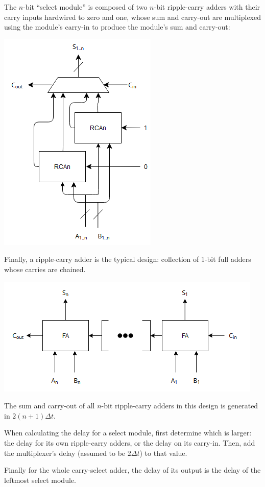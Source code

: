 \documentclass[12pt]{article}
\begin{document}
The $n$-bit ``select module'' is composed of two $n$-bit ripple-carry adders
with their carry inputs hardwired to zero and one, whose sum and carry-out are
multiplexed using the module's carry-in to produce the module's sum and
carry-out:

\includegraphics{select-module.png}

Finally, a ripple-carry adder is the typical design: collection of 1-bit full
adders whose carries are chained.

\includegraphics{ripple-carry.png}

The sum and carry-out of all $n$-bit ripple-carry adders in this design is
generated in $2(n + 1)\Delta t$.

When calculating the delay for a select module, first determine which is
larger: the delay for its own ripple-carry adders, or the delay on its
carry-in. Then, add the multiplexer's delay (assumed to be $2\Delta t$) to that
value.

Finally for the whole carry-select adder, the delay of its output is the delay
of the leftmost select module.
\end{document}
